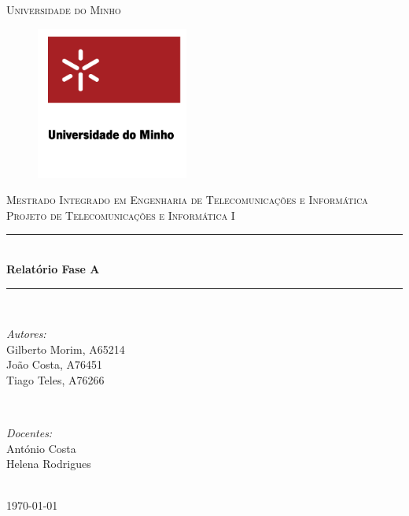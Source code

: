 \documentclass[12pt]{article} %
\begin{document}
	\begin{titlepage}
	\newcommand{\HRule}{\rule{\linewidth}{0.5mm}} %
	\center %
	\textsc{\LARGE Universidade do Minho}\\[1.5cm] %

	\begin{figure}[!htbp]
		\includegraphics[width=5cm]{ola.png}
		\centering
	\end{figure}

	\textsc{\Large Mestrado Integrado em Engenharia de Telecomunicações e Informática}\\[1cm] %
	\textsc{\large Projeto de Telecomunicações e Informática I}\\[0.5cm] %
	
	\HRule \\[0.4cm]
	{ \huge \bfseries Relatório Fase A}\\[0.4cm] %
	\HRule \\[1cm]

		\begin{minipage}{0.4\textwidth}
			\begin{flushleft} \large
				\emph{Autores:}\\
				Gilberto Morim, A65214\\
				João Costa, A76451\\
				Tiago Teles, A76266\\ %
			\end{flushleft}
		\end{minipage}
~
		\begin{minipage}{0.4\textwidth}
			\begin{flushright} \large
				\emph{Docentes:} \\
				António Costa \\
				Helena Rodrigues %
			\end{flushright}
		\end{minipage}\\[2cm]

	{\large \today}\\[3cm] %

		\vfill %
\end{titlepage}
\tableofcontents
\newpage
\end{document}
